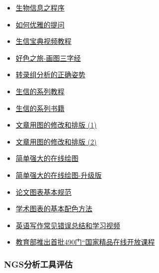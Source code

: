 \documentclass[]{article}
\providecommand{\tightlist}{%
  \setlength{\itemsep}{0pt}\setlength{\parskip}{0pt}}
\numberwithin{figure}{section}
\numberwithin{table}{section}
\begin{document}
\begin{itemize}
\tightlist
\item
  \href{http://mp.weixin.qq.com/s/xoLBg0pI9seEksa0hMXi0A}{生物信息之程序}
\item
  \href{http://mp.weixin.qq.com/s?__biz=MzI5MTcwNjA4NQ==\&mid=2247483955\&idx=1\&sn=946438376f94af6e8861b2b42701914e\&chksm=ec0dc7b9db7a4eafbef28fac1fb260f6f876f0ba674828784ac827dd23f9317f5a2d59d38bc0\#rd}{如何优雅的提问}
\item
  \href{http://mp.weixin.qq.com/s/C4EBufEtFF6bhBKrH8NXng}{生信宝典视频教程}
\item
  \href{https://mp.weixin.qq.com/s/bsvB1k17Izom2ldgdwXrdg}{好色之旅-画图三字经}
\item
  \href{http://mp.weixin.qq.com/s/Kx0gaU2x4pWjBq2I2Ffe6Q}{转录组分析的正确姿势}
\item
  \href{https://mp.weixin.qq.com/s/VguRtaGpEcaNzmZEi48gLg}{生信的系列教程}
\item
  \href{http://mp.weixin.qq.com/s/IiehgNu3JGVTDa079ll1SQ}{生信的系列书籍}
\item
  \href{https://mp.weixin.qq.com/s/IJNyhinakY0lSXgCN7b9ug}{文章用图的修改和排版 (1)}
\item
  \href{http://mp.weixin.qq.com/s/HTsufk71U3wf14OOWSKEeQ}{文章用图的修改和排版 (2)}
\item
  \href{http://mp.weixin.qq.com/s/Ld2dNcaWR-jIzolHw_tkHA}{简单强大的在线绘图}
\item
  \href{http://mp.weixin.qq.com/s/pTHHqxuf0y1MCCCBaZjt9A}{简单强大的在线绘图-升级版}
\item
  \href{http://mp.weixin.qq.com/s/SCT4oso_vI0UNIJZTaG95g}{论文图表基本规范}
\item
  \href{http://mp.weixin.qq.com/s/hq5p8Lqzn9Km2qVRLW2dVQ}{学术图表的基本配色方法}
\item
  \href{https://mp.weixin.qq.com/s/37dMnfA6RTSybzkzKnambw}{英语写作常见错误总结和学习视频}
\item
  \href{http://mp.weixin.qq.com/s/JKn4kRiXYz6RKzQbTMVYlg}{教育部推出首批490门``国家精品在线开放课程}
\end{itemize}

\hypertarget{ngsux5206ux6790ux5de5ux5177ux8bc4ux4f30}{%
\subsubsection{NGS分析工具评估}\label{ngsux5206ux6790ux5de5ux5177ux8bc4ux4f30}}
\end{document}
